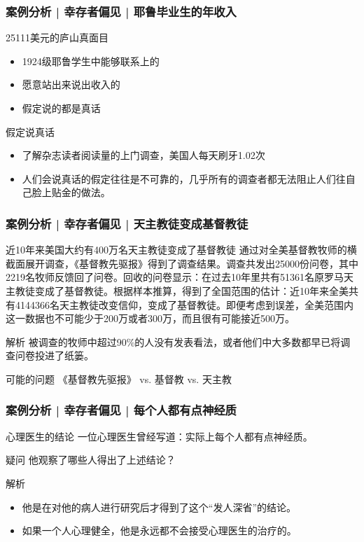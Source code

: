 \begin{frame}
  \frametitle{案例分析 | 幸存者偏见 | 耶鲁毕业生的年收入}
  \begin{block}{25111美元的庐山真面目}
    \begin{itemize}
      \item 1924级耶鲁学生中能够联系上的
      \item 愿意站出来说出收入的
      \item 假定说的都是真话
    \end{itemize}
  \end{block}
  \pause
  \begin{block}{假定说真话}
    \begin{itemize}
      \item 了解杂志读者阅读量的上门调查，美国人每天刷牙1.02次
      \item 人们会说真话的假定往往是不可靠的，几乎所有的调查者都无法阻止人们往自己脸上贴金的做法。
    \end{itemize}
  \end{block}
\end{frame}

\begin{frame}
  \frametitle{案例分析 | 幸存者偏见 | 天主教徒变成基督教徒}
  \begin{block}{近10年来美国大约有400万名天主教徒变成了基督教徒}
通过对全美基督教牧师的横截面展开调查，《基督教先驱报》得到了调查结果。调查共发出25000份问卷，其中2219名牧师反馈回了问卷。回收的问卷显示：在过去10年里共有51361名原罗马天主教徒变成了基督教徒。根据样本推算，得到了全国范围的估计：近10年来全美共有4144366名天主教徒改变信仰，变成了基督教徒。即便考虑到误差，全美范围内这一数据也不可能少于200万或者300万，而且很有可能接近500万。
  \end{block}
  \pause \pause \pause \pause
  \begin{block}{解析}
    被调查的牧师中超过90\%的人没有发表看法，或者他们中大多数都早已将调查问卷投进了纸篓。
  \end{block}
  \pause
  \begin{block}{可能的问题}
    《基督教先驱报》 vs. 基督教 vs. 天主教
  \end{block}
\end{frame}

\begin{frame}
  \frametitle{案例分析 | 幸存者偏见 | 每个人都有点神经质}
  \begin{block}{心理医生的结论}
    一位心理医生曾经写道：实际上每个人都有点神经质。
  \end{block}
  \pause \pause \pause \pause
  \begin{block}{疑问}
    他观察了哪些人得出了上述结论？
  \end{block}
  \pause
  \begin{block}{解析}
    \begin{itemize}
      \item 他是在对他的病人进行研究后才得到了这个“发人深省”的结论。
      \item 如果一个人心理健全，他是永远都不会接受心理医生的治疗的。
    \end{itemize}
  \end{block}
\end{frame}


